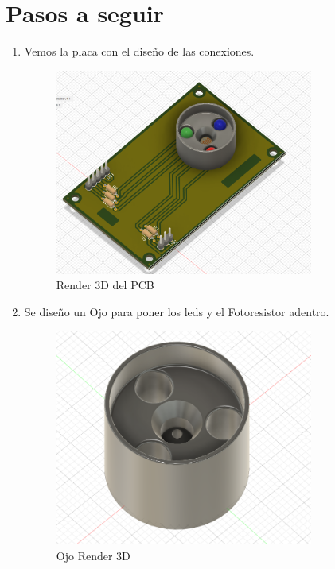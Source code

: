 \documentclass[12pt]{report}
\begin{document}
\section{Pasos a seguir}
\begin{enumerate}
  \item Vemos la placa con el diseño de las conexiones.
  \begin{figure}[H]
      \centering
      \includegraphics[width=0.8\textwidth]{screenshots/Objetivo.png}
      \caption{Render 3D del PCB}
      \label{fig:placaConDiseno}
  \end{figure}
  \item Se diseño un Ojo para poner los leds y el Fotoresistor adentro.
  \begin{figure}[H]
    \centering
    \includegraphics[width=0.8\textwidth]{screenshots/PiezaNegra.png}
    \caption{Ojo Render 3D}
    \label{fig:ojos}
  \end{figure}

\end{enumerate}
\end{document}
